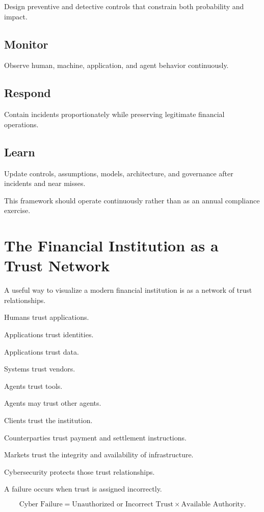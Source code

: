 Design preventive and detective controls that constrain both probability and impact.

\subsection{Monitor}

Observe human, machine, application, and agent behavior continuously.

\subsection{Respond}

Contain incidents proportionately while preserving legitimate financial operations.

\subsection{Learn}

Update controls, assumptions, models, architecture, and governance after incidents and near misses.

This framework should operate continuously rather than as an annual compliance exercise.

\section{The Financial Institution as a Trust Network}

A useful way to visualize a modern financial institution is as a network of trust relationships.

Humans trust applications.

Applications trust identities.

Applications trust data.

Systems trust vendors.

Agents trust tools.

Agents may trust other agents.

Clients trust the institution.

Counterparties trust payment and settlement instructions.

Markets trust the integrity and availability of infrastructure.

Cybersecurity protects those trust relationships.

A failure occurs when trust is assigned incorrectly.

\begin{equation}
\text{Cyber Failure}
=
\text{Unauthorized or Incorrect Trust}
\times
\text{Available Authority}.
\end{equation}

